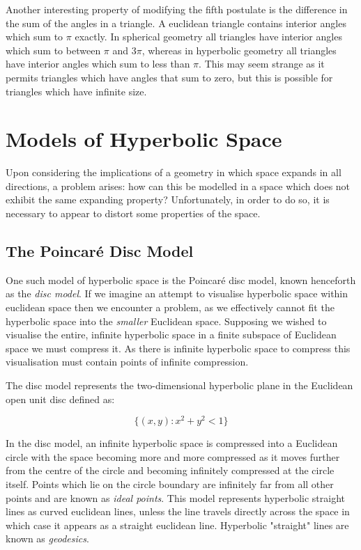 Another interesting property of modifying the fifth postulate is the difference in the sum of the angles in a triangle. A euclidean triangle contains interior angles which sum to $\pi$ exactly. In spherical geometry all triangles have interior angles which sum to between $\pi$ and 3$\pi$, whereas in hyperbolic geometry all triangles have interior angles which sum to less than $\pi$. This may seem strange as it permits triangles which have angles that sum to zero, but this is possible for triangles which have infinite size.

\section{Models of Hyperbolic Space}
\label{sec:LitReviewVisHyperbolic}

Upon considering the implications of a geometry in which space expands in all directions, a problem arises: how can this be modelled in a space which does not exhibit the same expanding property? Unfortunately, in order to do so, it is necessary to appear to distort some properties of the space.

\subsection{The Poincar\'{e} Disc Model}

One such model of hyperbolic space is the Poincar\'{e} disc model, known henceforth as the \textit{disc model}. If we imagine an attempt to visualise hyperbolic space within euclidean space then we encounter a problem, as we effectively cannot fit the hyperbolic space into the \textit{smaller} Euclidean space. Supposing we wished to visualise the entire, infinite hyperbolic space in a finite subspace of Euclidean space we must compress it. As there is infinite hyperbolic space to compress this visualisation must contain points of infinite compression.

The disc model represents the two-dimensional hyperbolic plane in the Euclidean open unit disc defined as\cite{blair_inversion_2000}:

\begin{equation}
\label{eq:open_unit_disc_eq}
\{(x,y):x^2 + y^2 <1\}
\end{equation}
 

In the disc model, an infinite hyperbolic space is compressed into a Euclidean circle with the space becoming more and more compressed as it moves further from the centre of the circle and becoming infinitely compressed at the circle itself. Points which lie on the circle boundary are infinitely far from all other points and are known as \textit{ideal points}.
This model represents hyperbolic straight lines as curved euclidean lines, unless the line travels directly across the space in which case it appears as a straight euclidean line. Hyperbolic "straight" lines are known as \textit{geodesics}.

